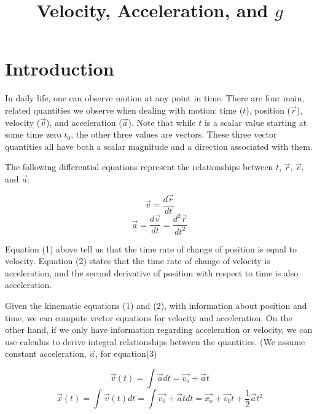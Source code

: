 \documentclass[journal,transmag]{IEEEtran}
\begin{document}
\title{Velocity, Acceleration, and $g$}


\author{}%



\maketitle


\IEEEdisplaynontitleabstractindextext
\IEEEpeerreviewmaketitle



\section{Introduction}
\indent In daily life, one can observe motion at any point in time. There are four main, related quantities we observe when dealing with motion: time ($t$), position ($\Vec{r}$), velocity ($\Vec{v}$), and acceleration ($\Vec{a}$). Note that while $t$ is a scalar value starting at some time zero $t_0$, the other three values are vectors. These three vector quantities all have both a scalar magnitude and a direction associated with them. 

\indent The following differential equations represent the relationships between $t$, $\Vec{r}$, $\Vec{v}$, and $\Vec{a}$:


\begin{equation}
    \Vec{v} =  \frac{d\Vec{r}}{dt} 
\end{equation}
\begin{equation}
     \Vec{a} = \frac{d\Vec{v}}{dt} = \frac{d^2\Vec{r}}{dt^2}   
\end{equation}

\indent Equation (1) above tell us that the time rate of change of position is equal to velocity. Equation (2) states that the time rate of change of velocity is acceleration, and the second derivative of position with respect to time is also acceleration.

Given the kinematic equations (1) and (2), with information about position and time, we can compute vector equations for velocity and acceleration. On the other hand, if we only have information regarding acceleration or velocity, we can use calculus to derive integral relationships between the quantities. (We assume constant acceleration, $\Vec{a}$, for equation(3)
    
\begin{equation}
    \Vec{v}(t) = \int \Vec{a} dt = \Vec{v_o} + \Vec{a}t
\end{equation}
\begin{equation}
    \Vec{x}(t) = \int \Vec{v}(t) dt = \int \Vec{v_0} + \Vec{a}t dt = \Vec{x_o} + \Vec{v_0}t + \frac{1}{2} \Vec{a}t^2 
\end{equation}
\end{document}
